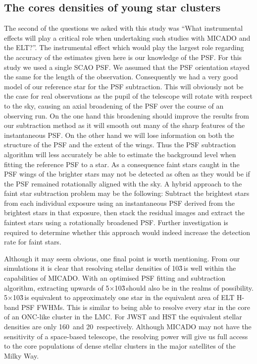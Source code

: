 \subsection{The cores densities of young star clusters}

The second of the questions we asked with this study was ``What instrumental
effects will play a critical role when undertaking such studies with MICADO and
the ELT?''. The instrumental effect which would play the largest role
regarding the accuracy of the estimates given here is our knowledge of the PSF.
For this study we used a single SCAO PSF. We assumed that the PSF orientation
stayed the same for the length of the observation. Consequently we had a very
good model of our reference star for the PSF subtraction. This will obviously
not be the case for real observations as the pupil of the telescope will rotate
with respect to the sky, causing an axial broadening of the PSF over the course
of an observing run. On the one hand this broadening should improve the results
from our subtraction method as it will smooth out many of the sharp features
of the instantaneous PSF. On the other hand we will lose information on both
the structure of the PSF and the extent of the wings. Thus the PSF subtraction
algorithm will less accurately be able to estimate the background level when
fitting the reference PSF to a star. As a consequence faint stars caught in the
PSF wings of the brighter stars may not be detected as often as they would be
if the PSF remained rotationally aligned with the sky. A hybrid approach to the
faint star subtraction problem may be the following: Subtract the brightest
stars from each individual exposure using an instantaneous PSF derived from the
brightest stars in that exposure, then stack the residual images and extract
the faintest stars using a rotationally broadened PSF. Further investigation is
required to determine whether this approach would indeed increase the detection
rate for faint stars.

Although it may seem obvious, one final point is worth mentioning. From our
simulations it is clear that resolving stellar densities of 10\h3\,\spa is well
within the capabilities of MICADO. With an optimised PSF fitting and
subtraction algorithm, extracting upwards of 5$\times$10\h3\,\spa should also
be in the realms of possibility. 5$\times$10\h3\,\spa is equivalent to
approximately one star in the equivalent area of  ELT H-band PSF FWHMs.
This is similar to being able to resolve every star in the core of an ONC-like
cluster in the LMC. For JWST and HST the equivalent stellar densities are only
160~\spa and 20~\spa respectively. Although MICADO may not have the sensitivity
of a space-based telescope, the resolving power will give us full access to the
core populations of dense stellar clusters in the major satellites of the
Milky Way.


